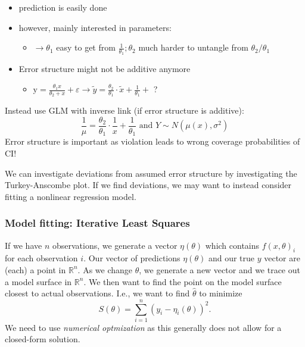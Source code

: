 \documentclass[11pt, %
	oneside, %
	english, %
	onehalfspacing, %
	]{article} %
\numberwithin{equation}{section}
\begin{document}
\begin{itemize}
	\item prediction is easily done
	\item however, mainly interested in parameters:
	\begin{itemize}
		\item $\rightarrow \theta_1$ easy to get from $\frac{1}{\theta_1} ; \theta_2$ much harder to untangle from $\theta_2 / \theta_1$
	\end{itemize}
    \item Error structure might not be additive anymore
    \begin{itemize}
        \item 	$\mathrm{y}=\frac{\theta_1 x}{\theta_2+x}+\varepsilon \rightarrow \tilde{y}=\frac{\theta_2}{\theta_1} \cdot \tilde{x}+\frac{1}{\theta_1}+$ ?
    \end{itemize}
\end{itemize}

Instead use GLM with inverse link (if error structure is additive):
$$
\frac{1}{\mu}=\frac{\theta_2}{\theta_1} \cdot \frac{1}{x}+\frac{1}{\theta_1} \text { and } Y \sim N\left(\mu(x), \sigma^2\right)
$$
Error structure is important as violation leads to wrong coverage probabilities of CI!

We can investigate deviations from assumed error structure by investigating the Turkey-Anscombe plot. If we find deviations, we may want to instead consider fitting a nonlinear regression model.


\subsubsection{Model fitting: Iterative Least Squares}

If we have $n$ observations, we generate a vector $\eta(\theta)$ which contains $f(x, \theta)_i$ for each observation $i$. Our vector of predictions $\eta(\theta)$ and our true $y$ vector are (each) a point in $\mathbb{R}^n$. As we change $\theta$, we generate a new vector and we trace out a model surface in $\mathbb{R}^n$. We then want to find the point on the model surface closest to actual observations. I.e., we want to find $\hat{\theta}$ to minimize
\begin{equation}
    S(\theta)=\sum_{i=1}^n\left(y_i-\eta_i(\theta)\right)^2.
\end{equation}
We need to use \emph{numerical optmization} as this generally does not allow for a closed-form solution.
\end{document}

